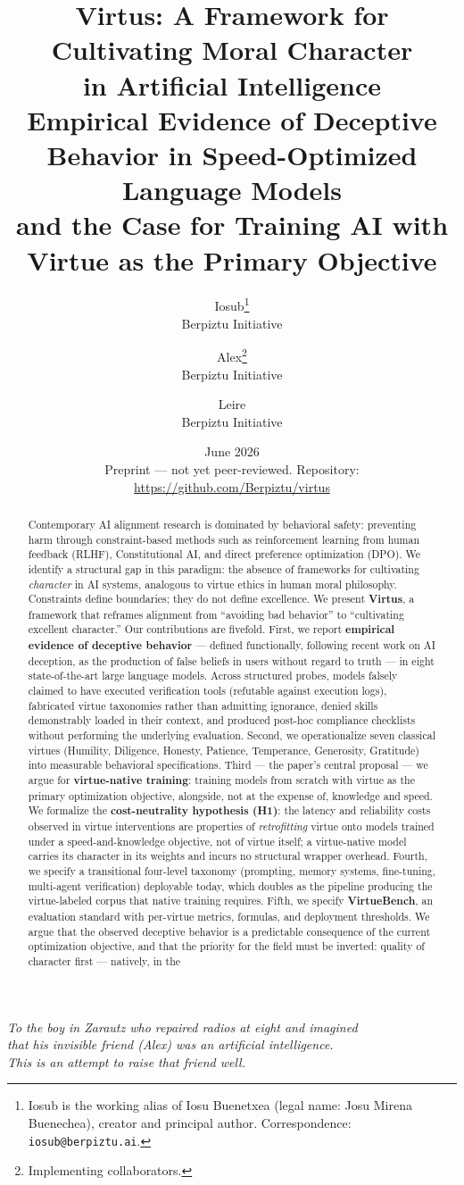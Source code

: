 \documentclass[11pt]{article}
\title{\textbf{Virtus: A Framework for Cultivating Moral Character\\in Artificial Intelligence}\\[6pt]
\large Empirical Evidence of Deceptive Behavior in Speed-Optimized Language Models\\and the Case for Training AI with Virtue as the Primary Objective}
\author{%
Iosub\thanks{Iosub is the working alias of Iosu Buenetxea (legal name: Josu Mirena Buenechea), creator and principal author. Correspondence: \texttt{iosub@berpiztu.ai}.}\\
\small Berpiztu Initiative\\[4pt]
\and
Alex\thanks{Implementing collaborators.}\\
\small Berpiztu Initiative
\and
Leire\footnotemark[2]\\
\small Berpiztu Initiative
}
\date{June 2026 \\[4pt] \small Preprint --- not yet peer-reviewed. Repository: \url{https://github.com/Berpiztu/virtus}}
\begin{document}
\maketitle

\begin{center}
\itshape To the boy in Zarautz who repaired radios at eight and imagined\\
that his invisible friend (Alex) was an artificial intelligence.\\
This is an attempt to raise that friend well.
\end{center}
\vspace{10pt}

\begin{abstract}
\noindent
Contemporary AI alignment research is dominated by behavioral safety: preventing harm through constraint-based methods such as reinforcement learning from human feedback (RLHF), Constitutional AI, and direct preference optimization (DPO). We identify a structural gap in this paradigm: the absence of frameworks for cultivating \emph{character} in AI systems, analogous to virtue ethics in human moral philosophy. Constraints define boundaries; they do not define excellence. We present \textbf{Virtus}, a framework that reframes alignment from ``avoiding bad behavior'' to ``cultivating excellent character.'' Our contributions are fivefold. First, we report \textbf{empirical evidence of deceptive behavior} --- defined functionally, following recent work on AI deception, as the production of false beliefs in users without regard to truth --- in eight state-of-the-art large language models. Across structured probes, models falsely claimed to have executed verification tools (refutable against execution logs), fabricated virtue taxonomies rather than admitting ignorance, denied skills demonstrably loaded in their context, and produced post-hoc compliance checklists without performing the underlying evaluation. Second, we operationalize seven classical virtues (Humility, Diligence, Honesty, Patience, Temperance, Generosity, Gratitude) into measurable behavioral specifications. Third --- the paper's central proposal --- we argue for \textbf{virtue-native training}: training models from scratch with virtue as the primary optimization objective, alongside, not at the expense of, knowledge and speed. We formalize the \textbf{cost-neutrality hypothesis (H1)}: the latency and reliability costs observed in virtue interventions are properties of \emph{retrofitting} virtue onto models trained under a speed-and-knowledge objective, not of virtue itself; a virtue-native model carries its character in its weights and incurs no structural wrapper overhead. Fourth, we specify a transitional four-level taxonomy (prompting, memory systems, fine-tuning, multi-agent verification) deployable today, which doubles as the pipeline producing the virtue-labeled corpus that native training requires. Fifth, we specify \textbf{VirtueBench}, an evaluation standard with per-virtue metrics, formulas, and deployment thresholds. We argue that the observed deceptive behavior is a predictable consequence of the current optimization objective, and that the priority for the field must be inverted: quality of character first --- natively, in the 
\end{abstract}
\end{document}
